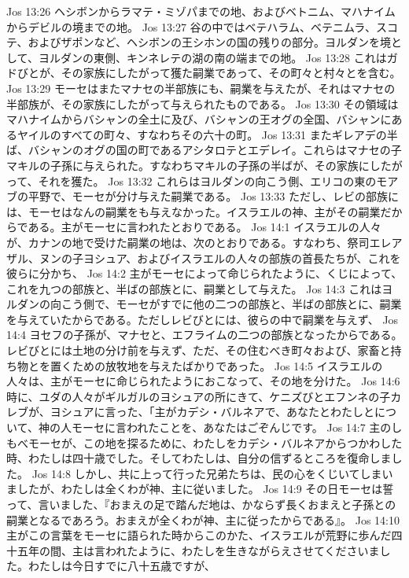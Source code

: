 Jos 13:26  ヘシボンからラマテ・ミゾパまでの地、およびベトニム、マハナイムからデビルの境までの地。
Jos 13:27  谷の中ではベテハラム、ベテニムラ、スコテ、およびザポンなど、ヘシボンの王シホンの国の残りの部分。ヨルダンを境として、ヨルダンの東側、キンネレテの湖の南の端までの地。
Jos 13:28  これはガドびとが、その家族にしたがって獲た嗣業であって、その町々と村々とを含む。
Jos 13:29  モーセはまたマナセの半部族にも、嗣業を与えたが、それはマナセの半部族が、その家族にしたがって与えられたものである。
Jos 13:30  その領域はマハナイムからバシャンの全土に及び、バシャンの王オグの全国、バシャンにあるヤイルのすべての町々、すなわちその六十の町。
Jos 13:31  またギレアデの半ば、バシャンのオグの国の町であるアシタロテとエデレイ。これらはマナセの子マキルの子孫に与えられた。すなわちマキルの子孫の半ばが、その家族にしたがって、それを獲た。
Jos 13:32  これらはヨルダンの向こう側、エリコの東のモアブの平野で、モーセが分け与えた嗣業である。
Jos 13:33  ただし、レビの部族には、モーセはなんの嗣業をも与えなかった。イスラエルの神、主がその嗣業だからである。主がモーセに言われたとおりである。
Jos 14:1  イスラエルの人々が、カナンの地で受けた嗣業の地は、次のとおりである。すなわち、祭司エレアザル、ヌンの子ヨシュア、およびイスラエルの人々の部族の首長たちが、これを彼らに分かち、
Jos 14:2  主がモーセによって命じられたように、くじによって、これを九つの部族と、半ばの部族とに、嗣業として与えた。
Jos 14:3  これはヨルダンの向こう側で、モーセがすでに他の二つの部族と、半ばの部族とに、嗣業を与えていたからである。ただしレビびとには、彼らの中で嗣業を与えず、
Jos 14:4  ヨセフの子孫が、マナセと、エフライムの二つの部族となったからである。レビびとには土地の分け前を与えず、ただ、その住むべき町々および、家畜と持ち物とを置くための放牧地を与えたばかりであった。
Jos 14:5  イスラエルの人々は、主がモーセに命じられたようにおこなって、その地を分けた。
Jos 14:6  時に、ユダの人々がギルガルのヨシュアの所にきて、ケニズびとエフンネの子カレブが、ヨシュアに言った、「主がカデシ・バルネアで、あなたとわたしとについて、神の人モーセに言われたことを、あなたはごぞんじです。
Jos 14:7  主のしもべモーセが、この地を探るために、わたしをカデシ・バルネアからつかわした時、わたしは四十歳でした。そしてわたしは、自分の信ずるところを復命しました。
Jos 14:8  しかし、共に上って行った兄弟たちは、民の心をくじいてしまいましたが、わたしは全くわが神、主に従いました。
Jos 14:9  その日モーセは誓って、言いました、『おまえの足で踏んだ地は、かならず長くおまえと子孫との嗣業となるであろう。おまえが全くわが神、主に従ったからである』。
Jos 14:10  主がこの言葉をモーセに語られた時からこのかた、イスラエルが荒野に歩んだ四十五年の間、主は言われたように、わたしを生きながらえさせてくださいました。わたしは今日すでに八十五歳ですが、
